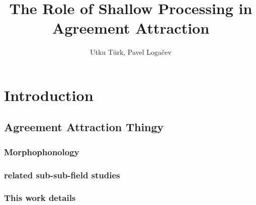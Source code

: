 \documentclass[doc,a4paper,man,natbib,floatsintext,noextraspace]{apa6}\usepackage[]{graphicx}\usepackage[]{color}
\title{The Role of Shallow Processing in Agreement Attraction}
\author{Utku Türk, Pavel Loga\v{c}ev}
\affiliation{Boğaziçi University}
\begin{document}
\maketitle


\section{Introduction} \label{sec:Intro}


\subsection{Agreement Attraction Thingy} \label{sec:Intro:literature}

\subsubsection{Morphophonology} \label{sec:Intro:literature:morphophonology}



\subsubsection{related sub-sub-field studies} \label{sec:Intro:literature:others}

\subsubsection{This work details} \label{sec:Intro:literature:thiswork}

\end{document}
